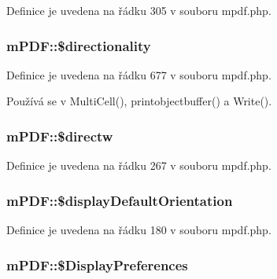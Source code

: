 Definice je uvedena na řádku 305 v souboru mpdf.\-php.

\hypertarget{classm_p_d_f_aa8c49884bb9ba37e215435e4ccbedbd3}{
\subsubsection[{\$directionality}]{\setlength{\rightskip}{0pt plus 5cm}m\-P\-D\-F\-::\$directionality}}\label{classm_p_d_f_aa8c49884bb9ba37e215435e4ccbedbd3}


Definice je uvedena na řádku 677 v souboru mpdf.\-php.



Používá se v Multi\-Cell(), printobjectbuffer() a Write().

\hypertarget{classm_p_d_f_a2a098e5ccf32f4c9831f449627755789}{
\subsubsection[{\$directw}]{\setlength{\rightskip}{0pt plus 5cm}m\-P\-D\-F\-::\$directw}}\label{classm_p_d_f_a2a098e5ccf32f4c9831f449627755789}


Definice je uvedena na řádku 267 v souboru mpdf.\-php.

\hypertarget{classm_p_d_f_aede55ecdea0dd5d177b9af5a2b50ce6e}{
\subsubsection[{\$display\-Default\-Orientation}]{\setlength{\rightskip}{0pt plus 5cm}m\-P\-D\-F\-::\$display\-Default\-Orientation}}\label{classm_p_d_f_aede55ecdea0dd5d177b9af5a2b50ce6e}


Definice je uvedena na řádku 180 v souboru mpdf.\-php.

\hypertarget{classm_p_d_f_a4692283db31af9b4d0ddca95f2ab0d99}{
\subsubsection[{\$\-Display\-Preferences}]{\setlength{\rightskip}{0pt plus 5cm}m\-P\-D\-F\-::\$\-Display\-Preferences}}\label{classm_p_d_f_a4692283db31af9b4d0ddca95f2ab0d99}


